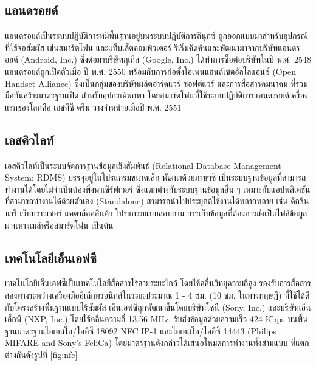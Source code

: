 \documentclass[12pt,a4paper,twocolumn]{article}
\begin{document}
\subsection{แอนดรอยด์}
แอนดรอยด์เป็นระบบปฏิบัติการที่มีพื้นฐานอยู่บนระบบปฏิบัติการลินุกซ์ ถูกออกแบบมาสำหรับอุปกรณ์ที่ใช้จอสัมผัส เช่นสมาร์ตโฟน และแท็บเล็ตคอมพิวเตอร์ ริเริ่มคิดค้นและพัฒนามาจากบริษัทแอนดรอยด์ (Android, Inc.) ซึ่งต่อมาบริษัทกูเกิล (Google, Inc.) ได้ทำการซื้อต่อบริษัทในปี พ.ศ. 2548 แอนดรอยด์ถูกเปิดตัวเมื่อ ปี พ.ศ. 2550 พร้อมกับการก่อตั้งโอเพนแฮนด์เซตอัลไลแอนซ์ (Open Handset Alliance) ซึ่งเป็นกลุ่มของบริษัทผลิตฮาร์ดแวร์ ซอฟต์แวร์ และการสื่อสารคมนาคม ที่ร่วมมือกันสร้างมาตรฐานเปิด สำหรับอุปกรณ์พกพา โดยสมาร์ตโฟนที่ใช้ระบบปฏิบัติการแอนดรอยด์เครื่องแรกของโลกคือ เอชทีซี ดรีม วางจำหน่ายเมื่อปี พ.ศ. 2551

\subsection{เอสคิวไลท์}
เอสคิวไลท์เป็นระบบจัดการฐานข้อมูลเชิงสัมพันธ์ (Relational Database Management System: RDMS) บรรจุอยู่ในโปรแกรมขนาดเล็ก พัฒนาด้วยภาษาซี เป็นระบบฐานข้อมูลที่สามารถทำงานได้โดยไม่จำเป็นต้องพึ่งพาเซิร์ฟเวอร์ ซึ่งแตกต่างกับระบบฐานข้อมูลอื่น ๆ เหมาะกับแอปพลิเคชันที่สามารถทำงานได้ด้วยตัวเอง (Standalone) สามารถนำไปประยุกต์ใช้งานได้หลากหลาย เช่น ดิกชินนารี เว็บบราวเซอร์ แคตาล็อคสินค้า โปรแกรมแบบสอบถาม การเก็บข้อมูลที่ต้องการส่งเป็นไฟล์ข้อมูลผ่านทางเมล์หรือสมาร์ตโฟน เป็นต้น

\subsection{เทคโนโลยีเอ็นเอฟซี}
เทคโนโลยีเอ็นเอฟซีเป็นเทคโนโลยีสื่อสารไร้สายระยะใกล้ โดยใช้คลื่นวิทยุความถี่สูง รองรับการสื่อสารสองทางระหว่างเครื่องมืออิเล็กทรอนิกส์ในระยะประมาณ 1 - 4 ซม. (10 ซม. ในทางทฤษฎี) ที่ใช้ได้ดีกับโครงสร้างพื้นฐานแบบไร้สัมผัส เอ็นเอฟซีถูกพัฒนาขึ้นโดยบริษัทโซนี (Sony, Inc.) และบริษัทเอ็นเอ็กพี (NXP, Inc.) โดยใช้คลื่นความถี่ 13.56 MHz. รับส่งข้อมูลด้วยความเร็ว 424 Kbps บนพื้นฐานมาตรฐานไอเอสโอ/ไออีซี 18092 NFC IP-1 \cite{itm:prp-rfid} และไอเอสโอ/ไออีซี 14443 \cite{itm:cicc} (Philips MIFARE and Sony’s FeliCa) โดยมาตรฐานดังกล่าวได้เสนอโหมดการทำงานทั้งสามแบบ \cite{itm:IDA-Pay} ที่แตกต่างกันดังรูปที่ \ref{fig:nfc}
\end{document}
